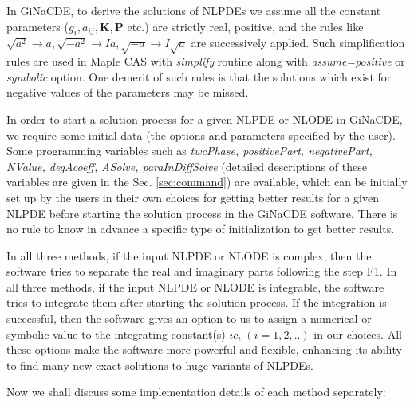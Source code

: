 \documentclass[prd,aps,floats,showkeys,nofootinbib,notitlepage]{revtex4-2}
\begin{document}
	In GiNaCDE, to derive the solutions of NLPDEs we assume all the constant parameters ($g_i,a_{ij},\boldsymbol{K},\boldsymbol{P}$ etc.) are strictly real, positive, and the rules like $\sqrt{a^2}\rightarrow a,\sqrt{-a^2}\rightarrow Ia, \sqrt{-a}\rightarrow I\sqrt{a}$ are successively applied. Such simplification rules are used in {Maple} CAS with {\em simplify} routine along with {\em assume=positive} or {\em symbolic} option. One demerit of such rules is that the solutions which exist for negative values of the parameters may be missed. 
	
	In order to start a solution process for a given NLPDE or NLODE in GiNaCDE, we require some initial data (the options and parameters specified by the user). Some programming variables such as \textit{twcPhase, positivePart, negativePart, NValue,  degAcoeff, ASolve, paraInDiffSolve} (detailed descriptions of these variables are given in the Sec. \ref{sec:command}) are available, which can be initially set up by the users in their own choices for getting better results for a given NLPDE before starting the solution process in the GiNaCDE software. There is no rule to know in advance a specific type of initialization to get better results.
	
	In all three methods, if the input NLPDE or NLODE  is complex, then the software tries to separate the real and imaginary parts following the step F1.
	In all three methods, if the input NLPDE or NLODE is integrable, the software tries to integrate them after starting the solution process. If the integration is successful, then the software gives an option to us to assign a numerical or symbolic value to the integrating constant(s) $ic_i\;(i=1,2,..)$ in our choices. All these options make the software more powerful and flexible, enhancing its ability to find many new exact solutions to huge variants of NLPDEs.
	
	Now we shall discuss some implementation details of each method separately:
	
\end{document}

